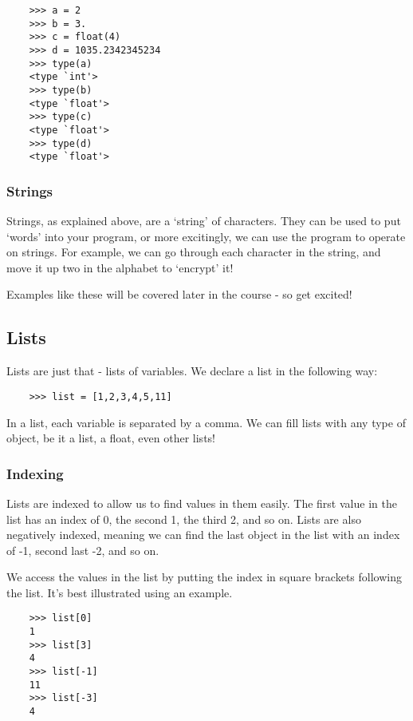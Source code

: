 \begin{lstlisting}
    >>> a = 2
    >>> b = 3.
    >>> c = float(4)
    >>> d = 1035.2342345234
    >>> type(a)
    <type `int'>
    >>> type(b)
    <type `float'>
    >>> type(c)
    <type `float'>
    >>> type(d)
    <type `float'>
\end{lstlisting}

\subsubsection{Strings}

Strings, as explained above, are a `string' of characters. They can be used to
put `words' into your program, or more excitingly, we can use the program to
operate on strings. For example, we can go through each character in the string,
and move it up two in the alphabet to `encrypt' it!

Examples like these will be covered later in the course - so get excited!

\subsection{Lists}

Lists are just that - lists of variables. We declare a list in the following
way:

\begin{lstlisting}
    >>> list = [1,2,3,4,5,11]
\end{lstlisting}

In a list, each variable is separated by a comma. We can fill lists with any
type of object, be it a list, a float, even other lists!

\subsubsection{Indexing}

Lists are indexed to allow us to find values in them easily. The first value in
the list has an index of 0, the second 1, the third 2, and so on. Lists are also
negatively indexed, meaning we can find the last object in the list with an
index of -1, second last -2, and so on.

We access the values in the list by putting the index in square brackets
following the list. It's best illustrated using an example.

\begin{lstlisting}
    >>> list[0]
    1
    >>> list[3]
    4
    >>> list[-1]
    11
    >>> list[-3]
    4
\end{lstlisting}

